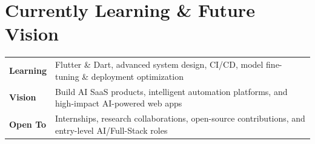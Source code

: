 \documentclass[a4paper,11pt]{article}
\begin{document}
\section{Currently Learning \& Future Vision}
\begin{tabularx}{\linewidth}{@{}l X@{}}
\textbf{Learning}    & Flutter \& Dart, advanced system design, CI/CD, model fine-tuning \& deployment optimization \\[3pt]
\textbf{Vision}      & Build AI SaaS products, intelligent automation platforms, and high-impact AI-powered web apps \\[3pt]
\textbf{Open To}     & Internships, research collaborations, open-source contributions, and entry-level AI/Full-Stack roles \\
\end{tabularx}

\vspace{8pt}
\end{document}
